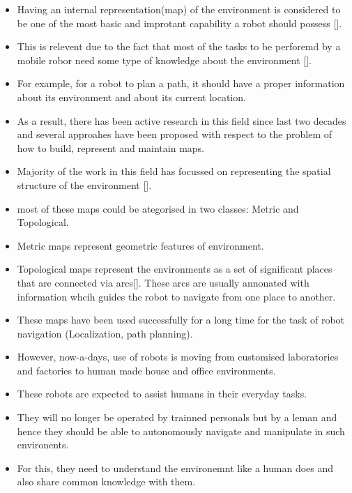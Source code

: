 \begin{itemize} 
 \item Having an internal representation(map) of the environment is considered to be one of the most basic and improtant capability a robot should possess [].
 \item This is relevent due to the fact that most of the tasks to be perforemd by a mobile robor need some type of knowledge about the environment [].
 \item For example, for a robot to plan a path, it should have a proper information about its environment and about its current location.
 \item As a result, there has been active research in this field since last two decades and several approahes have been proposed with respect to the problem of how to build, represent and maintain maps.
 \item Majority of the work in this field has focussed on representing the spatial structure of the environment [].\\
 \item most of these maps could be ategorised in two classes: Metric and Topological.\\
 \item Metric maps represent geometric features of environment.\
 \item Topological maps represent the environments as a set of significant places that are connected via arcs[]. These arcs are usually annonated with information whcih guides the robot to navigate from one place to another. 
 \item These maps have been used successfully for a long time for the task of robot navigation (Localization, path planning).
 
 \item However, now-a-days, use of robots is moving from customised laboratories and factories to human made house and office environments.
 \item These robots are expected to assist humans in their everyday tasks. 
 \item They will no longer be operated by trainned personals but by a leman and hence they should be able to autonomously navigate and manipulate in such environents.
 \item For this, they need to understand the environemnt like a human does and also share common knowledge with them.
 

\end{itemize}
